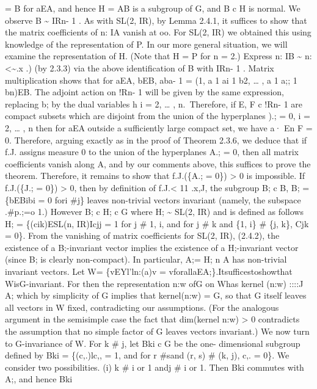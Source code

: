\documentclass[
]{article}
\begin{document}
= B for aEA, and hence H = AB is a subgroup of G, and B c H is normal.
We observe B \textasciitilde{} IRn- 1 . As with SL(2, IR), by Lemma
2.4.1, it suffices to show that the matrix coefficients of n: IA vanish
at oo. For SL(2, IR) we obtained this using knowledge of the
representation of P. In our more general situation, we will examine the
representation of H. (Note that H = P for n = 2.) Express n: IB
\textasciitilde{} n:\textless\textasciitilde.x .) (by 2.3.3) via the
above identification of B with IRn- 1 . Matrix multiplication shows that
for aEA, bEB, aba- 1 = (1, a 1 ai 1 b2, \ldots{} , a 1 a;; 1 bn)EB. The
adjoint action on !Rn- 1 will be given by the same expression, replacing
b; by the dual variables h i = 2, \ldots{} , n.~Therefore, if E, F c
!Rn- 1 are compact subsets which are disjoint from the union of the
hyperplanes ).; = 0, i = 2, \ldots{} , n then for aEA outside a
sufficiently large compact set, we have a· En F = 0. Therefore, arguing
exactly as in the proof of Theorem 2.3.6, we deduce that if f.J. assigns
measure 0 to the union of the hyperplanes A.; = 0, then all matrix
coefficients vanish along A, and by our comments above, this suffices to
prove the theorem. Therefore, it remains to show that f.J.(\{A.; = 0\})
\textgreater{} 0 is impossible. If f.J.(\{J.; = 0\}) \textgreater{} 0,
then by definition of f.J.\textless{} 11 .x,J, the subgroup B; c B, B; =
\{bEBibi = 0 fori \#j\} leaves non-trivial vectors invariant (namely,
the subspace .\#p.;=o 1.) However B; c H; c G where H; \textasciitilde{}
SL(2, IR) and is defined as follows H; = \{(cik)ESL(n, IR)Icjj = 1 for j
\# 1, i, and for j \# k and \{1, i\} \# \{j, k\}, Cjk = 0\}. From the
vanishing of matrix coefficients for SL(2, IR), (2.4.2), the existence
of a B;-invariant vector implies the existence of a H;-invariant vector
(since B; is clearly non-compact). In particular, A;= H; n A has
non-trivial invariant vectors. Let W= \{vEYl'ln:(a)v =
vforallaEA;\}.Itsufficestoshowthat WisG-invariant. For then the
representation n:w ofG on Whas kernel (n:w) ::::J A; which by simplicity
of G implies that kernel(n:w) = G, so that G itself leaves all vectors
in W fixed, contradicting our assumptions. (For the analogous argument
in the semisimple case the fact that dim(kernel n:w) \textgreater{} 0
contradicts the assumption that no simple factor of G leaves vectors
invariant.) We now turn to G-invariance of W. For k \# j, let Bki c G be
the one- dimensional subgroup defined by Bki = \{(c,.)lc,, = 1, and for
r \#sand (r, s) \# (k, j), c,. = 0\}. We consider two possibilities. (i)
k \# i or 1 andj \# i or 1. Then Bki commutes with A;, and hence Bki
\end{document}
